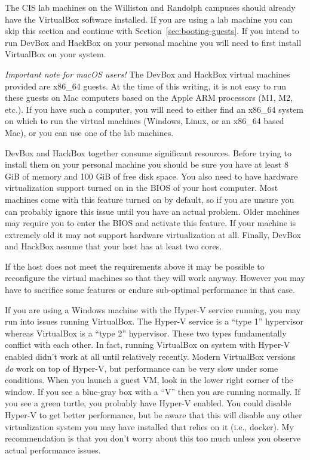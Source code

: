\documentclass[twocolumn]{article}
\begin{document}
The CIS lab machines on the Williston and Randolph campuses should already have the VirtualBox
software installed. If you are using a lab machine you can skip this section and continue with
Section~\ref{sec:booting-guests}. If you intend to run DevBox and HackBox on your personal
machine you will need to first install VirtualBox on your system.

\textit{Important note for macOS users!} The DevBox and HackBox virtual machines provided are
x86\_64 guests. At the time of this writing, it is not easy to run these guests on Mac computers
based on the Apple ARM processors (M1, M2, etc.). If you have such a computer, you will need to
either find an x86\_64 system on which to run the virtual machines (Windows, Linux, or an
x86\_64 based Mac), or you can use one of the lab machines.

DevBox and HackBox together consume significant resources. Before trying to install them on your
personal machine you should be sure you have at least 8 GiB of memory and 100 GiB of free disk
space. You also need to have hardware virtualization support turned on in the BIOS of your host
computer. Most machines come with this feature turned on by default, so if you are unsure you
can probably ignore this issue until you have an actual problem. Older machines may require you
to enter the BIOS and activate this feature. If your machine is extremely old it may not support
hardware virtualization at all. Finally, DevBox and HackBox assume that your host has at least
two cores.

If the host does not meet the requirements above it may be possible to reconfigure the virtual
machines so that they will work anyway. However you may have to sacrifice some features or
endure sub-optimal performance in that case.

If you are using a Windows machine with the Hyper-V service running, you may run into issues
running VirtualBox. The Hyper-V service is a ``type 1'' hypervisor whereas VirtualBox is a
``type 2'' hypervisor. These two types fundamentally conflict with each other. In fact, running
VirtualBox on system with Hyper-V enabled didn't work at all until relatively recently. Modern
VirtualBox versions \emph{do} work on top of Hyper-V, but performance can be very slow under
some conditions. When you launch a guest VM, look in the lower right corner of the window. If
you see a blue-gray box with a ``V'' then you are running normally. If you see a green turtle,
you probably have Hyper-V enabled. You could disable Hyper-V to get better performance, but be
aware that this will disable any other virtualization system you may have installed that relies
on it (i.e., docker). My recommendation is that you don't worry about this too much unless you
observe actual performance issues.
\end{document}

